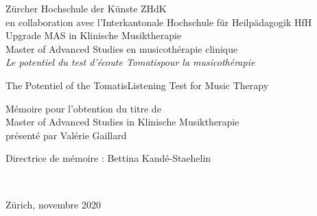 
\begin{titlepage}
 \begin{center}
    {\Large
     Zürcher Hochschule der Künste ZHdK\\
 	en collaboration avec l'Interkantonale Hochschule für
        Heilpädagogik HfH \\
	 Upgrade MAS in Klinische Musiktherapie \\ Master of Advanced Studies en musicothérapie clinique\\}
  \vfill
  {\Huge \emph{Le potentiel du test d'écoute Tomatis\textsuperscript \textregistered  pour la 
  musicothérapie} 
  	\vfill%
} \medskip


{\LARGE The Potentiel of the Tomatis\textsuperscript \textregistered Listening Test for  Music Therapy } 
\vfill

{\Large Mémoire pour l'obtention du titre de\\ \medskip
Master of Advanced Studies in Klinische Musiktherapie \\ \smallskip 
présenté par Valérie Gaillard}

{\large Directrice de mémoire : Bettina Kandé-Staehelin}



	 \hfill \\
	 \rule{0mm}{1pt} \hfill
{\large Zürich, novembre  2020}
 \end{center}
\end{titlepage}
